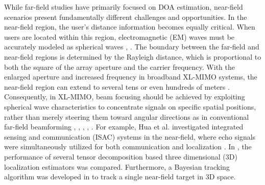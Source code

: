 \documentclass[lettersize,journal]{IEEEtran}
\begin{document}
While far-field studies have primarily focused on DOA estimation, near-field scenarios present fundamentally different challenges and opportunities. In the near-field region, the user’s distance information becomes equally critical. When users are located within this region, electromagnetic (EM) waves must be accurately modeled as spherical waves \cite{cui2022channel}, \cite{zhang2022beam}. The boundary between the far-field and near-field regions is determined by the Rayleigh distance, which is proportional to both the square of the array aperture and the carrier frequency. With the enlarged aperture and increased frequency in broadband XL-MIMO systems, the near-field region can extend to several tens or even hundreds of meters \cite{zhang2022beam}. Consequently, in XL-MIMO, beam focusing should be achieved by exploiting spherical wave characteristics to concentrate signals on specific spatial positions, rather than merely steering them toward angular directions as in conventional far-field beamforming \cite{liu2024near}, \cite{liu2025near}, \cite{11030222}, \cite{khamidullina2021conditional}, \cite{guerra2021near}. For example, Hua et al. investigated integrated sensing and communication (ISAC) systems in the near-field, where echo signals were simultaneously utilized for both communication and localization \cite{11030222}. In \cite{khamidullina2021conditional}, the performance of several tensor decomposition based three dimensional (3D) localization estimators was compared. Furthermore, a Bayesian tracking algorithm was developed in \cite{guerra2021near} to track a single near-field target in 3D space.

\IEEEpubidadjcol
\end{document}
